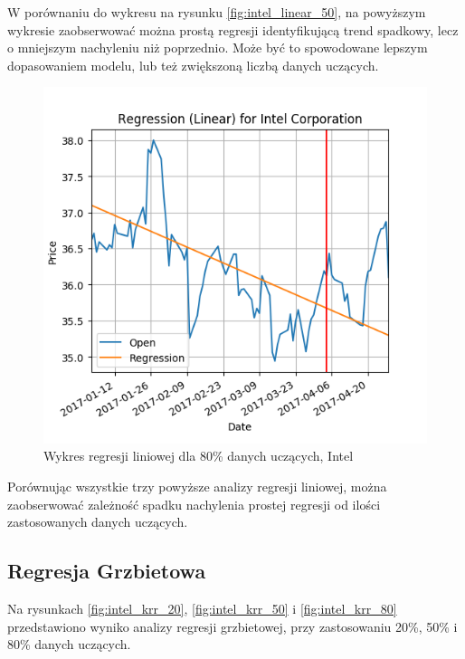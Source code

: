 W porównaniu do wykresu na rysunku \ref{fig:intel_linear_50}, na powyższym wykresie zaobserwować można prostą regresji identyfikującą trend spadkowy, lecz o mniejszym nachyleniu niż poprzednio.
Może być to spowodowane lepszym dopasowaniem modelu, lub też zwiększoną liczbą danych uczących.\\

\begin{figure}[h!]
\centering
\includegraphics[width=150mm]{pictures/plots/intel_linear_80.png}
\caption{Wykres regresji liniowej dla 80\% danych uczących, Intel}
\label{fig:intel_linear_80}
\end{figure}

Porównując wszystkie trzy powyższe analizy regresji liniowej, można zaobserwować zależność spadku nachylenia prostej regresji od ilości zastosowanych danych uczących.

\subsection{Regresja Grzbietowa}

Na rysunkach \ref{fig:intel_krr_20}, \ref{fig:intel_krr_50} i \ref{fig:intel_krr_80} przedstawiono wyniko analizy regresji grzbietowej, przy zastosowaniu 20\%, 50\% i 80\% danych uczących.\\

